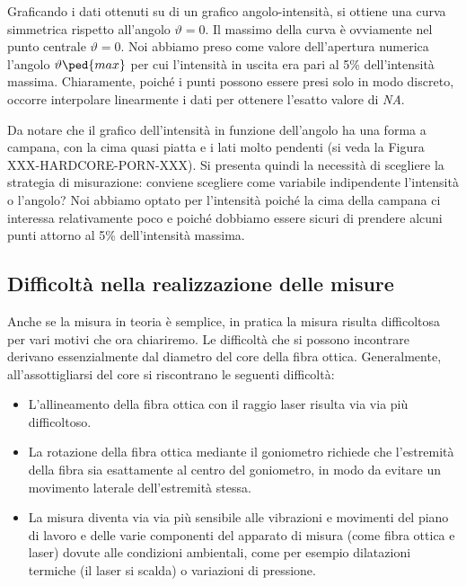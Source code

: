 Graficando i dati ottenuti su di un grafico angolo-intensità, si ottiene una curva simmetrica rispetto all'angolo $\vartheta = 0$.
Il massimo della curva è ovviamente nel punto centrale $\vartheta = 0$. Noi abbiamo preso come valore dell'apertura numerica
l'angolo $\vartheta\ped{max}$ per cui l'intensità in uscita era pari al 5\% dell'intensità massima. Chiaramente, poiché i punti
possono essere presi solo in modo discreto, occorre interpolare linearmente i dati per ottenere l'esatto valore di \emph{NA}.

Da notare che il grafico dell'intensità in funzione dell'angolo ha una forma a campana, con la cima quasi piatta e i lati molto pendenti
(si veda la Figura XXX-HARDCORE-PORN-XXX). Si presenta quindi la necessità di scegliere la strategia di misurazione: conviene
scegliere come variabile indipendente l'intensità o l'angolo? Noi abbiamo optato per l'intensità poiché la cima della campana
ci interessa relativamente poco e poiché dobbiamo essere sicuri di prendere alcuni punti attorno al 5\% dell'intensità massima.

\subsection{Difficoltà nella realizzazione delle misure}

Anche se la misura in teoria è semplice, in pratica la misura risulta difficoltosa per vari motivi che ora chiariremo.
Le difficoltà che si possono incontrare derivano essenzialmente dal diametro del core della fibra ottica. Generalmente,
all'assottigliarsi del core si riscontrano le seguenti difficoltà:

\begin{itemize}
    \item{L'allineamento della fibra ottica con il raggio laser risulta via via più difficoltoso.}
    \item{La rotazione della fibra ottica mediante il goniometro richiede che l'estremità della fibra sia esattamente
        al centro del goniometro, in modo da evitare un movimento laterale dell'estremità stessa.}
    \item{La misura diventa via via più sensibile alle vibrazioni e movimenti del piano di lavoro e delle varie componenti
        del apparato di misura (come fibra ottica e laser) dovute alle condizioni ambientali, come per esempio dilatazioni termiche
        (il laser si scalda) o variazioni di pressione.}
\end{itemize}

